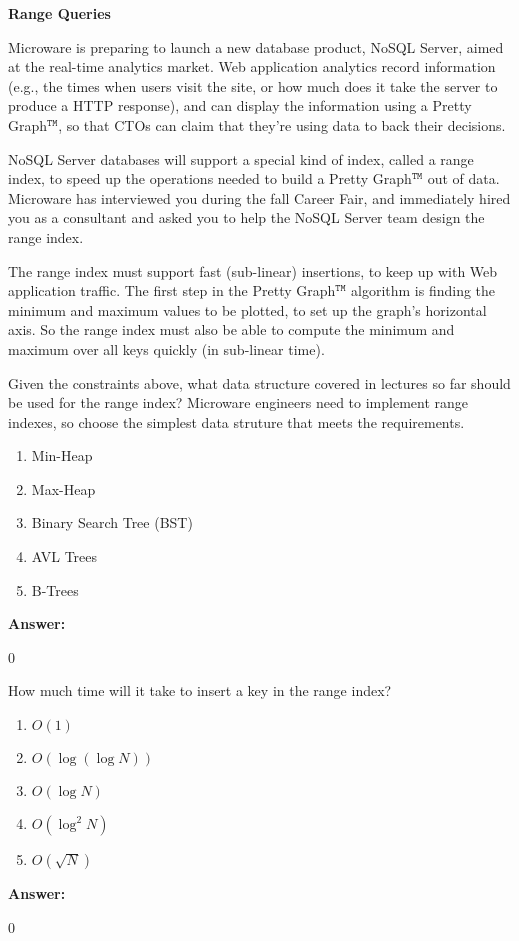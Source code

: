 \documentclass[12pt,twoside]{article}
\newcommand{\answer}{
 \par\medskip
 \textbf{Answer:}
}
\newcommand{\answerIa}{ \answer
0
}
\newcommand{\answerIb}{ \answer
0
}
\begin{document}
\begin{problems}

\problem {} \textbf{Range Queries}

Microware is preparing to launch a new database product, NoSQL Server, aimed at the
real-time analytics market. Web application analytics record information (e.g., the
times when users visit the site, or how much does it take the server to produce a
HTTP response), and can display the information using a Pretty Graph$^{\texttt{TM}}$,
so that CTOs can claim that they’re using data to back their decisions.

NoSQL Server databases will support a special kind of index, called a range index,
to speed up the operations needed to build a Pretty Graph$^{\texttt{TM}}$ out of data.
Microware has interviewed you during the fall Career Fair, and immediately hired you
as a consultant and asked you to help the NoSQL Server team design the range index.

The range index must support fast (sub-linear) insertions, to keep up with Web
application traffic. The first step in the Pretty Graph$^{\texttt{TM}}$ algorithm is
finding the minimum and maximum values to be plotted, to set up the graph’s
horizontal axis. So the range index must also be able to compute the minimum and
maximum over all keys quickly (in sub-linear time).

\begin{problemparts}
  \problempart {} Given the constraints above, what data structure covered
  in lectures so far should be used for the range index? Microware engineers need
  to implement range indexes, so choose the simplest data struture that meets the
  requirements.
    \begin{enumerate}
      \item Min-Heap
      \item Max-Heap
      \item Binary Search Tree (BST)
      \item AVL Trees
      \item B-Trees
    \end{enumerate}
\answerIa

  \problempart {} How much time will it take to insert a key in the range
  index?
    \begin{enumerate}
      \item $O(1)$
      \item $O(\log(\log N))$
      \item $O(\log N)$
      \item $O(\log^2 N)$
      \item $O(\sqrt{N})$
    \end{enumerate}
\answerIb
    

\end{problemparts}
\end{problems}
\end{document}
